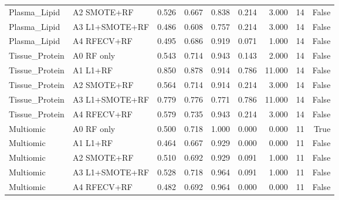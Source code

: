 \begin{table}[t]
\begin{tabular}{llrrrrrrr}
Plasma\_Lipid & A2 SMOTE+RF & 0.526 & 0.667 & 0.838 & 0.214 & 3.000 & 14 & False \\
Plasma\_Lipid & A3 L1+SMOTE+RF & 0.486 & 0.608 & 0.757 & 0.214 & 3.000 & 14 & False \\
Plasma\_Lipid & A4 RFECV+RF & 0.495 & 0.686 & 0.919 & 0.071 & 1.000 & 14 & False \\
Tissue\_Protein & A0 RF only & 0.543 & 0.714 & 0.943 & 0.143 & 2.000 & 14 & False \\
Tissue\_Protein & A1 L1+RF & 0.850 & 0.878 & 0.914 & 0.786 & 11.000 & 14 & False \\
Tissue\_Protein & A2 SMOTE+RF & 0.564 & 0.714 & 0.914 & 0.214 & 3.000 & 14 & False \\
Tissue\_Protein & A3 L1+SMOTE+RF & 0.779 & 0.776 & 0.771 & 0.786 & 11.000 & 14 & False \\
Tissue\_Protein & A4 RFECV+RF & 0.579 & 0.735 & 0.943 & 0.214 & 3.000 & 14 & False \\
Multiomic & A0 RF only & 0.500 & 0.718 & 1.000 & 0.000 & 0.000 & 11 & True \\
Multiomic & A1 L1+RF & 0.464 & 0.667 & 0.929 & 0.000 & 0.000 & 11 & False \\
Multiomic & A2 SMOTE+RF & 0.510 & 0.692 & 0.929 & 0.091 & 1.000 & 11 & False \\
Multiomic & A3 L1+SMOTE+RF & 0.528 & 0.718 & 0.964 & 0.091 & 1.000 & 11 & False \\
Multiomic & A4 RFECV+RF & 0.482 & 0.692 & 0.964 & 0.000 & 0.000 & 11 & False \\
\hline
\end{tabular}
\end{table}
